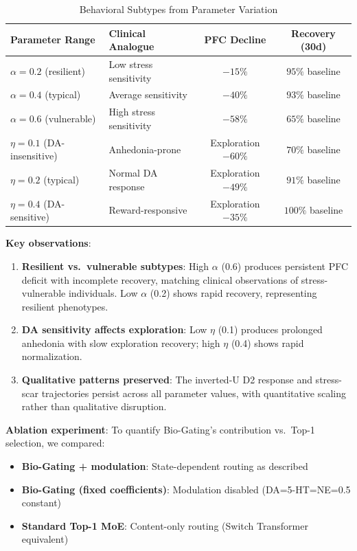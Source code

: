 \documentclass[preprint,12pt]{elsarticle}
\begin{document}
\begin{table}[htbp]
\centering
\caption{Behavioral Subtypes from Parameter Variation}
\label{tab:subtypes}
\begin{tabular}{llcc}
\toprule
\textbf{Parameter Range} & \textbf{Clinical Analogue} & \textbf{PFC Decline} & \textbf{Recovery (30d)} \\
\midrule
$\alpha = 0.2$ (resilient) & Low stress sensitivity & $-15\%$ & $95\%$ baseline \\
$\alpha = 0.4$ (typical) & Average sensitivity & $-40\%$ & $93\%$ baseline \\
$\alpha = 0.6$ (vulnerable) & High stress sensitivity & $-58\%$ & $65\%$ baseline \\
\midrule
$\eta = 0.1$ (DA-insensitive) & Anhedonia-prone & Exploration $-60\%$ & $70\%$ baseline \\
$\eta = 0.2$ (typical) & Normal DA response & Exploration $-49\%$ & $91\%$ baseline \\
$\eta = 0.4$ (DA-sensitive) & Reward-responsive & Exploration $-35\%$ & $100\%$ baseline \\
\bottomrule
\end{tabular}
\end{table}

\textbf{Key observations}:
\begin{enumerate}
\item \textbf{Resilient vs.\ vulnerable subtypes}: High $\alpha$ (0.6) produces persistent PFC deficit with incomplete recovery, matching clinical observations of stress-vulnerable individuals. Low $\alpha$ (0.2) shows rapid recovery, representing resilient phenotypes.
\item \textbf{DA sensitivity affects exploration}: Low $\eta$ (0.1) produces prolonged anhedonia with slow exploration recovery; high $\eta$ (0.4) shows rapid normalization.
\item \textbf{Qualitative patterns preserved}: The inverted-U D2 response and stress-scar trajectories persist across all parameter values, with quantitative scaling rather than qualitative disruption.
\end{enumerate}

\textbf{Ablation experiment}: To quantify Bio-Gating's contribution vs.\ Top-1 selection, we compared:
\begin{itemize}
\item \textbf{Bio-Gating + modulation}: State-dependent routing as described
\item \textbf{Bio-Gating (fixed coefficients)}: Modulation disabled (DA=5-HT=NE=0.5 constant)
\item \textbf{Standard Top-1 MoE}: Content-only routing (Switch Transformer equivalent)
\end{itemize}
\end{document}
